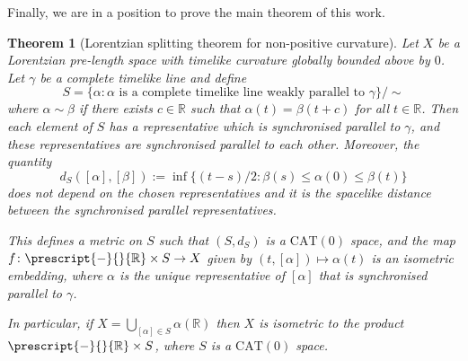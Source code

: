 \documentclass[11pt,reqno]{amsart}
\theoremstyle{definition}
\theoremstyle{definition}
\theoremstyle{plain}
\newtheorem{thm}[dfn]{Theorem}
\theoremstyle{remark}
\newcommand{\R}{\mathbb R}
\newcommand{\LpLS}{Lorentzian pre-length space }
\begin{document}
Finally, we are in a position to prove the main theorem of this work. 

\begin{thm}[Lorentzian splitting theorem for non-positive curvature]\label{thm:lorentzianHadamard}
Let $X$ be a \LpLS with timelike curvature globally bounded above by $0$. 
Let $\gamma$ be a complete timelike line and define
\[
S=\{\alpha:\alpha\text{ is a complete timelike line weakly parallel to }\gamma\}/\sim
\]
where $\alpha\sim\beta$ if there exists $c\in\mathbb{R}$ such that $\alpha(t) = \beta(t+c)$ for all $t\in \mathbb{R}$. Then each element of $S$ has a representative which is synchronised parallel to $\gamma$, and these representatives are synchronised parallel to each other. Moreover, the quantity
\[
d_S([\alpha],[\beta]) := \inf\{(t-s)/2:\beta(s)\leq\alpha(0)\leq\beta(t)\}
\]
does not depend on the chosen representatives and it is the spacelike distance between the synchronised parallel representatives. 

This defines a metric on $S$ such that $(S,d_S)$ is a $\mathrm{CAT}(0)$ space, and the map $f\colon \prescript{-}{}{\mathbb{R}}\times S\to X$ given by $(t,[\alpha]) \mapsto {\alpha}(t)$ is an isometric embedding, where ${\alpha}$ is the unique representative of $[\alpha]$ that is synchronised parallel to $\gamma$.

In particular, if $X=\bigcup_{[\alpha]\in S}\alpha(\R)$ then $X$ is isometric to the product $\prescript{-}{}{\R}\times S$, where $S$ is a $\mathrm{CAT}(0)$ space.
\end{thm}
\end{document}
